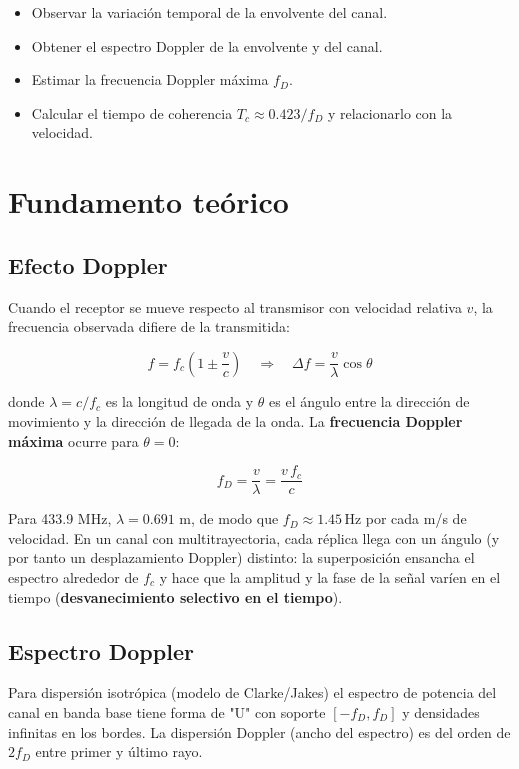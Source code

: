 \documentclass[11pt,a4paper]{article}
\begin{document}
\begin{itemize}
  \item Observar la variación temporal de la envolvente del canal.
  \item Obtener el espectro Doppler de la envolvente y del canal.
  \item Estimar la frecuencia Doppler máxima $f_D$.
  \item Calcular el tiempo de coherencia $T_c \approx 0.423/f_D$ y relacionarlo con la velocidad.
\end{itemize}

\section{Fundamento teórico}

\subsection{Efecto Doppler}

Cuando el receptor se mueve respecto al transmisor con velocidad relativa $v$, la frecuencia observada difiere de la transmitida:

\[
f = f_c\left(1 \pm \frac{v}{c}\right) \quad\Rightarrow\quad \Delta f = \frac{v}{\lambda}\cos\theta
\]

donde $\lambda = c/f_c$ es la longitud de onda y $\theta$ es el ángulo entre la dirección de movimiento y la dirección de llegada de la onda. La \textbf{frecuencia Doppler máxima} ocurre para $\theta = 0$:

\[
f_D = \frac{v}{\lambda} = \frac{v\,f_c}{c}
\]

Para 433.9 MHz, $\lambda = 0.691$ m, de modo que $f_D \approx 1.45\,\mathrm{Hz}$ por cada m/s de velocidad. En un canal con multitrayectoria, cada réplica llega con un ángulo (y por tanto un desplazamiento Doppler) distinto: la superposición ensancha el espectro alrededor de $f_c$ y hace que la amplitud y la fase de la señal varíen en el tiempo (\textbf{desvanecimiento selectivo en el tiempo}).

\subsection{Espectro Doppler}

Para dispersión isotrópica (modelo de Clarke/Jakes) el espectro de potencia del canal en banda base tiene forma de "U" con soporte $[-f_D, f_D]$ y densidades infinitas en los bordes. La dispersión Doppler (ancho del espectro) es del orden de $2f_D$ entre primer y último rayo.
\end{document}
